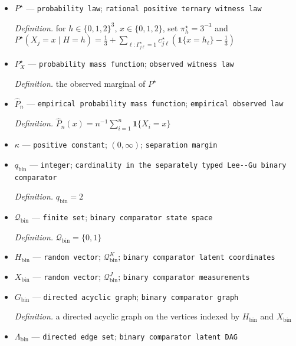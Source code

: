 \documentclass{article}
\begin{document}
\begin{itemize}
  \par\smallskip\noindent\emph{Definition.} two realizations are equivalent when related by \(\mathfrak G\) and their latent DAGs are Markov equivalent
  \item \(P^{\star}\) --- \texttt{probability law}; \texttt{rational positive ternary witness law}
  \par\smallskip\noindent\emph{Definition.} for \(h\in\{0,1,2\}^3\), \(x\in\{0,1,2\}\), set \(\pi_h^{\star}=3^{-3}\) and \(P^{\star}(X_j=x\mid H=h)=\frac13+\sum_{\ell:\Gamma^{\star}_{j\ell}=1}c^{\star}_{j\ell}(\mathbf1\{x=h_\ell\}-\frac13)\)
  \item \(P_X^{\star}\) --- \texttt{probability mass function}; \texttt{observed witness law}
  \par\smallskip\noindent\emph{Definition.} the observed marginal of \(P^{\star}\)
  \item \(\widehat P_n\) --- \texttt{empirical probability mass function}; \texttt{empirical observed law}
  \par\smallskip\noindent\emph{Definition.} \(\widehat P_n(x)=n^{-1}\sum_{i=1}^n\mathbf1\{X_i=x\}\)
  \item \(\kappa\) --- \texttt{positive constant}; \((0,\infty)\); \texttt{separation margin}
  \item \(q_{\mathrm{bin}}\) --- \texttt{integer}; \texttt{cardinality in the separately typed Lee-\allowbreak{}-\allowbreak{}Gu binary comparator}
  \par\smallskip\noindent\emph{Definition.} \(q_{\mathrm{bin}}=2\)
  \item \(\mathcal Q_{\mathrm{bin}}\) --- \texttt{finite set}; \texttt{binary comparator state space}
  \par\smallskip\noindent\emph{Definition.} \(\mathcal Q_{\mathrm{bin}}=\{0,1\}\)
  \item \(H_{\mathrm{bin}}\) --- \texttt{random vector}; \(\mathcal Q_{\mathrm{bin}}^K\); \texttt{binary comparator latent coordinates}
  \item \(X_{\mathrm{bin}}\) --- \texttt{random vector}; \(\mathcal Q_{\mathrm{bin}}^J\); \texttt{binary comparator measurements}
  \item \(G_{\mathrm{bin}}\) --- \texttt{directed acyclic graph}; \texttt{binary comparator graph}
  \par\smallskip\noindent\emph{Definition.} a directed acyclic graph on the vertices indexed by \(H_{\mathrm{bin}}\) and \(X_{\mathrm{bin}}\)
  \item \(\Lambda_{\mathrm{bin}}\) --- \texttt{directed edge set}; \texttt{binary comparator latent DAG}

\end{itemize}
\end{document}
